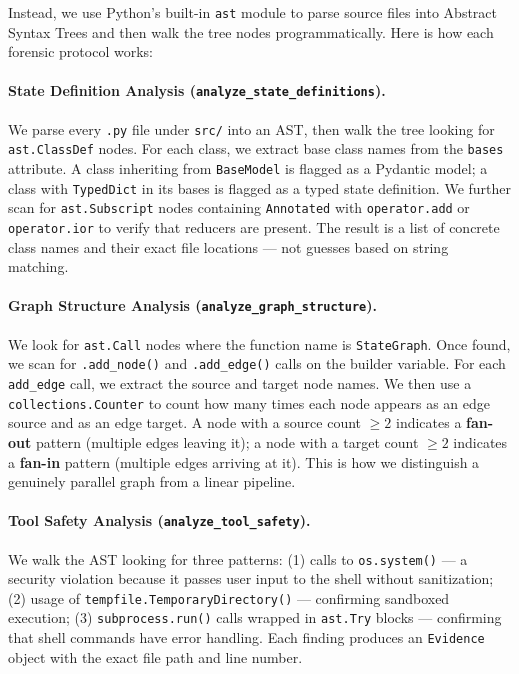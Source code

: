 \documentclass[12pt,a4paper]{article}
\begin{document}
Instead, we use Python's built-in \texttt{ast} module to parse source files into Abstract Syntax Trees and then walk the tree nodes programmatically. Here is how each forensic protocol works:

\paragraph{State Definition Analysis (\texttt{analyze\_state\_definitions}).}
We parse every \texttt{.py} file under \texttt{src/} into an AST, then walk the tree looking for \texttt{ast.ClassDef} nodes. For each class, we extract base class names from the \texttt{bases} attribute. A class inheriting from \texttt{BaseModel} is flagged as a Pydantic model; a class with \texttt{TypedDict} in its bases is flagged as a typed state definition. We further scan for \texttt{ast.Subscript} nodes containing \texttt{Annotated} with \texttt{operator.add} or \texttt{operator.ior} to verify that reducers are present. The result is a list of concrete class names and their exact file locations --- not guesses based on string matching.

\paragraph{Graph Structure Analysis (\texttt{analyze\_graph\_structure}).}
We look for \texttt{ast.Call} nodes where the function name is \texttt{StateGraph}. Once found, we scan for \texttt{.add\_node()} and \texttt{.add\_edge()} calls on the builder variable. For each \texttt{add\_edge} call, we extract the source and target node names. We then use a \texttt{collections.Counter} to count how many times each node appears as an edge source and as an edge target. A node with a source count $\geq 2$ indicates a \textbf{fan-out} pattern (multiple edges leaving it); a node with a target count $\geq 2$ indicates a \textbf{fan-in} pattern (multiple edges arriving at it). This is how we distinguish a genuinely parallel graph from a linear pipeline.

\paragraph{Tool Safety Analysis (\texttt{analyze\_tool\_safety}).}
We walk the AST looking for three patterns: (1) calls to \texttt{os.system()} --- a security violation because it passes user input to the shell without sanitization; (2) usage of \texttt{tempfile.TemporaryDirectory()} --- confirming sandboxed execution; (3) \texttt{subprocess.run()} calls wrapped in \texttt{ast.Try} blocks --- confirming that shell commands have error handling. Each finding produces an \texttt{Evidence} object with the exact file path and line number.
\end{document}
